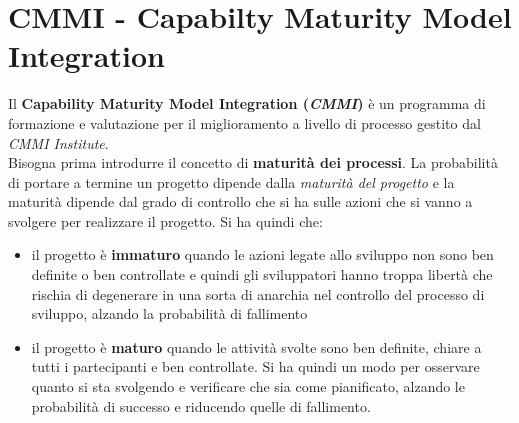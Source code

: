 \section{CMMI - Capabilty Maturity Model Integration}
Il \textbf{Capability Maturity Model Integration (\textit{CMMI})} è un programma di formazione e valutazione per il miglioramento a livello di processo gestito dal \textit{CMMI Institute}.\\ 
Bisogna prima introdurre il concetto di \textbf{maturità dei processi}. 
La probabilità di portare a termine un progetto dipende dalla \textit{maturità del progetto} e la maturità dipende dal grado di controllo che si ha sulle azioni che si vanno a svolgere per realizzare il progetto. 
Si ha quindi che: 
    \begin{itemize} \item il progetto è \textbf{immaturo} quando le azioni legate allo sviluppo non sono ben definite o ben controllate e quindi gli sviluppatori hanno troppa libertà che rischia di degenerare in una sorta di anarchia nel controllo del processo di sviluppo, alzando la probabilità di fallimento 
    \item il progetto è \textbf{maturo} quando le attività svolte sono ben definite, chiare a tutti i partecipanti e ben controllate. Si ha quindi un modo per osservare quanto si sta svolgendo e verificare che sia come pianificato, alzando le probabilità di successo e riducendo quelle di fallimento.
\end{itemize}

